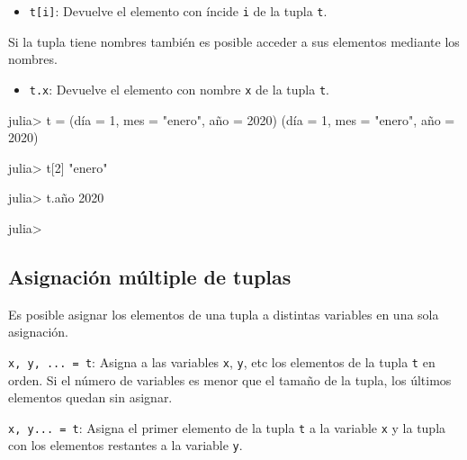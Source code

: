 \documentclass[
  letterpaper,
  DIV=11,
  numbers=noendperiod]{scrreprt}
\newenvironment{Shaded}{\begin{snugshade}}{\end{snugshade}}
\newcommand{\FloatTok}[1]{\textcolor[rgb]{0.68,0.00,0.00}{#1}}
\newcommand{\NormalTok}[1]{\textcolor[rgb]{0.00,0.23,0.31}{#1}}
\newcommand{\OperatorTok}[1]{\textcolor[rgb]{0.37,0.37,0.37}{#1}}
\newcommand{\StringTok}[1]{\textcolor[rgb]{0.13,0.47,0.30}{#1}}
\providecommand{\tightlist}{%
  \setlength{\itemsep}{0pt}\setlength{\parskip}{0pt}}\usepackage{longtable,booktabs,array}
\begin{document}
\begin{itemize}
\tightlist
\item
  \texttt{t{[}i{]}}: Devuelve el elemento con íncide \texttt{i} de la
  tupla \texttt{t}.
\end{itemize}

Si la tupla tiene nombres también es posible acceder a sus elementos
mediante los nombres.

\begin{itemize}
\tightlist
\item
  \texttt{t.x}: Devuelve el elemento con nombre \texttt{x} de la tupla
  \texttt{t}.
\end{itemize}

\begin{Shaded}
\begin{Highlighting}[]
\NormalTok{julia}\OperatorTok{\textgreater{}}\NormalTok{ t }\OperatorTok{=}\NormalTok{ (día }\OperatorTok{=} \FloatTok{1}\NormalTok{, mes }\OperatorTok{=} \StringTok{"enero"}\NormalTok{, año }\OperatorTok{=}  \FloatTok{2020}\NormalTok{)}
\NormalTok{(día }\OperatorTok{=} \FloatTok{1}\NormalTok{, mes }\OperatorTok{=} \StringTok{"enero"}\NormalTok{, año }\OperatorTok{=} \FloatTok{2020}\NormalTok{)}

\NormalTok{julia}\OperatorTok{\textgreater{}}\NormalTok{ t[}\FloatTok{2}\NormalTok{]}
\StringTok{"enero"}

\NormalTok{julia}\OperatorTok{\textgreater{}}\NormalTok{ t.año}
\FloatTok{2020}

\NormalTok{julia}\OperatorTok{\textgreater{}} 
\end{Highlighting}
\end{Shaded}

\hypertarget{asignaciuxf3n-muxfaltiple-de-tuplas}{%
\subsection{Asignación múltiple de
tuplas}\label{asignaciuxf3n-muxfaltiple-de-tuplas}}

Es posible asignar los elementos de una tupla a distintas variables en
una sola asignación.

\texttt{x,\ y,\ ...\ =\ t}: Asigna a las variables \texttt{x},
\texttt{y}, etc los elementos de la tupla \texttt{t} en orden. Si el
número de variables es menor que el tamaño de la tupla, los últimos
elementos quedan sin asignar.

\texttt{x,\ y...\ =\ t}: Asigna el primer elemento de la tupla
\texttt{t} a la variable \texttt{x} y la tupla con los elementos
restantes a la variable \texttt{y}.
\end{document}
